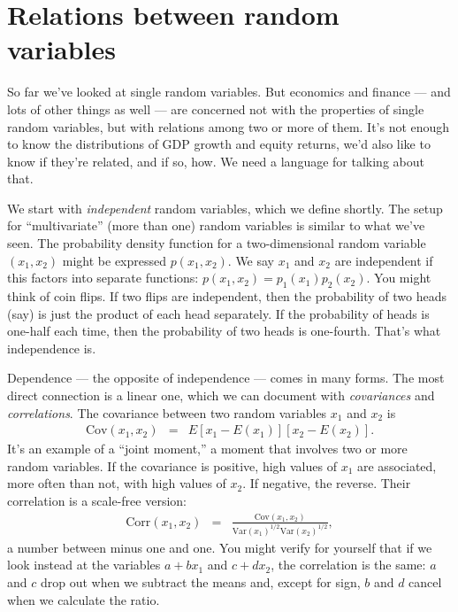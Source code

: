 \documentclass[11pt]{article}
\begin{document}




\section{Relations between random variables}

So far we've looked at single random variables.
But economics and finance --- and lots of other things as well ---
are concerned not with the properties
of single random variables, but with relations among two or more of them.
It's not enough to know the distributions of GDP growth
and equity returns,
we'd also like to know if they're related, and if so, how.
We need a language for talking about that.
%

We start with {\it independent\/} random variables,
which we define shortly.
The setup for ``multivariate'' (more than one) random variables
is similar to what we've seen.
The probability density function for a two-dimensional random variable
$(x_1,x_2)$ might be expressed $p(x_1,x_2)$.
We say $x_1$ and $x_2$ are independent if this factors into separate functions:
$p(x_1,x_2) = p_1(x_1) p_2(x_2) $.
You might think of coin flips.
If two flips are independent, then the probability of two heads (say)
is just the product of each head separately.
If the probability of heads is one-half each time,
then the probability of two heads is one-fourth.
That's what independence is.

Dependence  ---
 the opposite of independence ---
comes in many forms.
The most direct connection is a linear one,
which we can document with {\it covariances\/}
and {\it correlations\/}.
The covariance between two  random variables $x_1$ and $x_2$ is
\begin{eqnarray*}
    \mbox{Cov} (x_1,x_2) &=& E [x_{1} - E({x}_1)] [x_{2} - E({x}_2)] .
\end{eqnarray*}
It's an example of a ``joint moment,''
a moment that involves two or more random variables.
If the covariance is positive, high values of $x_1$ are associated,
more often than not, with high values of $x_2$.
If negative, the reverse.
Their correlation is a scale-free version:
\begin{eqnarray}
    \mbox{Corr}(x_1,x_2) &=&
            \frac {\mbox{Cov}(x_1,x_2)} {\mbox{Var}(x_1)^{1/2} \mbox{Var}(x_2)^{1/2} } ,
    \label{eq:correlation}
\end{eqnarray}
a number between minus one and one.
You might verify for yourself that if we look instead at the
variables $a + bx_1$ and $c + dx_2$, the correlation is the same:
$a$ and $c$ drop out when we subtract the means and,
except for sign, $b$ and $d$ cancel when we calculate the ratio.
\end{document}
